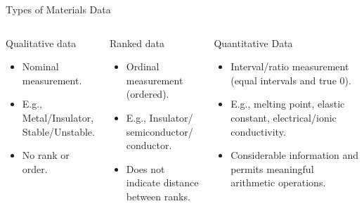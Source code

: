 \documentclass[aspectratio=169]{beamer}
\begin{document}
    \begin{frame}[t]{Types of Materials Data}
        \begin{columns}[t]
            \begin{exampleblock}{Qualitative data}
                \begin{itemize}
                    \item Nominal measurement.
                    \item E.g., Metal/Insulator, Stable/Unstable.
                    \item No rank or order.
                \end{itemize}
            \end{exampleblock}
            \begin{exampleblock}{Ranked data}
                \begin{itemize}
                    \item Ordinal measurement (ordered).
                    \item E.g., Insulator/ semiconductor/ conductor.
                    \item Does not indicate distance between ranks.
                \end{itemize}
            \end{exampleblock}
            \begin{exampleblock}{Quantitative Data
            }
                \begin{itemize}
                    \item Interval/ratio measurement (equal intervals and true 0).
                    \item E.g., melting point, elastic constant, electrical/ionic conductivity.
                    \item Considerable information and permits meaningful arithmetic operations.
                \end{itemize}
            \end{exampleblock}
        \end{columns}
    \end{frame}
\end{document}
